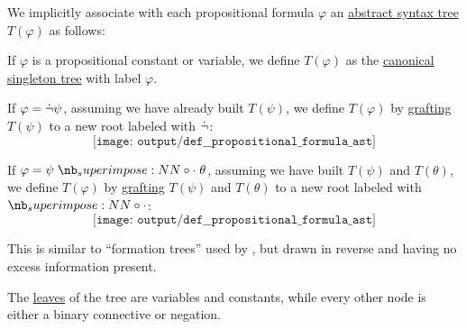 \begin{definition}\label{def:propositional_formula_ast}\mimprovised
  We implicitly associate with each propositional formula \( \varphi \) an \hyperref[con:abstract_syntax_tree]{abstract syntax tree} \( T(\varphi) \) as follows:
  \begin{thmenum}
     If \( \varphi \) is a propositional constant or variable, we define \( T(\varphi) \) as the \hyperref[def:canonical_singleton_tree]{canonical singleton tree} with label \( \varphi \).

     If \( \varphi = \dot{\neg} \psi \), assuming we have already built \( T(\psi) \), we define \( T(\varphi) \) by \hyperref[def:ordered_tree_grafting_product]{grafting} \( T(\psi) \) to a new root labeled with \( \dot{\neg} \):
    \begin{equation*}
      \texttt{[image: output/def\_\_propositional\_formula\_ast]}
    \end{equation*}

     If \( \varphi = \psi \syncirc \theta \), assuming we have built \( T(\psi) \) and \( T(\theta) \), we define \( T(\varphi) \) by \hyperref[def:ordered_tree_grafting_product]{grafting} \( T(\psi) \) and \( T(\theta) \) to a new root labeled with \( \syncirc \):
    \begin{equation*}
      \texttt{[image: output/def\_\_propositional\_formula\_ast]}
    \end{equation*}
  \end{thmenum}
\end{definition}
\begin{comments}
  \item This is similar to \enquote{formation trees} used by , but drawn in reverse and having no excess information present.

  \item The \hyperref[def:rooted_tree/leaf]{leaves} of the tree are variables and constants, while every other node is either a binary connective or negation.
\end{comments}

